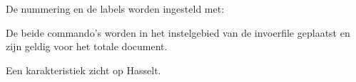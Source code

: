 
De nummering en de labels worden ingesteld met:


De beide commando's worden in het instelgebied van de
invoerfile geplaatst en zijn geldig voor het totale
document.

\startbuffer
\stelplaatsblokkenin
  [plaats=rechts]

\stelblokkopjesin
  [plaats=boven,
   letter=vetschuin]

\plaatsfiguur
  {Een karakteristiek zicht op Hasselt.}
  {\externfiguur[ma-cb-12][breedte=8cm]}
\stopbuffer

\typebuffer

\start
\haalbuffer
\stop

\stoponderdeel
